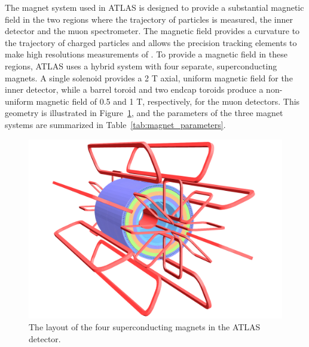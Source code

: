 The magnet system used in \ac{ATLAS} is designed to provide a substantial magnetic field in the two regions where the trajectory of particles is measured, the inner detector and the muon spectrometer.
The magnetic field provides a curvature to the trajectory of charged particles and allows the precision tracking elements to make high resolutions measurements of \pt.
To provide a magnetic field in these regions, \ac{ATLAS} uses a hybrid system with four separate, superconducting magnets.
A single solenoid provides a 2 T axial, uniform magnetic field for the inner detector, while a barrel toroid and two endcap toroids produce a non-uniform magnetic field of 0.5 and 1 T, respectively, for the muon detectors.
This geometry is illustrated in Figure~\ref{fig:magnets_overview}, and the parameters of the three magnet systems are summarized in Table~\ref{tab:magnet_parameters}.

\begin{figure}[hbtp]
\centering
\includegraphics[width=\fullfig]{figures/magnets_overview.pdf}
\caption{The layout of the four superconducting magnets in the \ac{ATLAS} detector.}
\label{fig:magnets_overview}
\end{figure}

